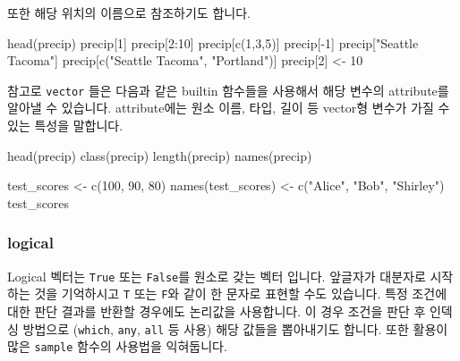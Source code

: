 \documentclass[
  a4paper,
]{book}
\newenvironment{Shaded}{\begin{snugshade}}{\end{snugshade}}
\newcommand{\DecValTok}[1]{\textcolor[rgb]{0.68,0.00,0.00}{#1}}
\newcommand{\FunctionTok}[1]{\textcolor[rgb]{0.28,0.35,0.67}{#1}}
\newcommand{\NormalTok}[1]{\textcolor[rgb]{0.00,0.23,0.31}{#1}}
\newcommand{\OtherTok}[1]{\textcolor[rgb]{0.00,0.23,0.31}{#1}}
\newcommand{\SpecialCharTok}[1]{\textcolor[rgb]{0.37,0.37,0.37}{#1}}
\newcommand{\StringTok}[1]{\textcolor[rgb]{0.13,0.47,0.30}{#1}}
\begin{document}
또한 해당 위치의 이름으로 참조하기도 합니다.

\begin{Shaded}
\begin{Highlighting}[]
\FunctionTok{head}\NormalTok{(precip)}
\NormalTok{precip[}\DecValTok{1}\NormalTok{]}
\NormalTok{precip[}\DecValTok{2}\SpecialCharTok{:}\DecValTok{10}\NormalTok{]}
\NormalTok{precip[}\FunctionTok{c}\NormalTok{(}\DecValTok{1}\NormalTok{,}\DecValTok{3}\NormalTok{,}\DecValTok{5}\NormalTok{)]}
\NormalTok{precip[}\SpecialCharTok{{-}}\DecValTok{1}\NormalTok{]}
\NormalTok{precip[}\StringTok{"Seattle Tacoma"}\NormalTok{]}
\NormalTok{precip[}\FunctionTok{c}\NormalTok{(}\StringTok{"Seattle Tacoma"}\NormalTok{, }\StringTok{"Portland"}\NormalTok{)]}
\NormalTok{precip[}\DecValTok{2}\NormalTok{] }\OtherTok{\textless{}{-}} \DecValTok{10}
\end{Highlighting}
\end{Shaded}

참고로 \texttt{vector} 들은 다음과 같은 builtin 함수들을 사용해서 해당
변수의 attribute를 알아낼 수 있습니다. attribute에는 원소 이름, 타입,
길이 등 vector형 변수가 가질 수 있는 특성을 말합니다.

\begin{Shaded}
\begin{Highlighting}[]
\FunctionTok{head}\NormalTok{(precip)}
\FunctionTok{class}\NormalTok{(precip)}
\FunctionTok{length}\NormalTok{(precip)}
\FunctionTok{names}\NormalTok{(precip)}

\NormalTok{test\_scores }\OtherTok{\textless{}{-}} \FunctionTok{c}\NormalTok{(}\DecValTok{100}\NormalTok{, }\DecValTok{90}\NormalTok{, }\DecValTok{80}\NormalTok{)}
\FunctionTok{names}\NormalTok{(test\_scores) }\OtherTok{\textless{}{-}} \FunctionTok{c}\NormalTok{(}\StringTok{"Alice"}\NormalTok{, }\StringTok{"Bob"}\NormalTok{, }\StringTok{"Shirley"}\NormalTok{)}
\NormalTok{test\_scores}
\end{Highlighting}
\end{Shaded}

\hypertarget{logical}{%
\subsubsection{logical}\label{logical}}

Logical 벡터는 \texttt{True} 또는 \texttt{False}를 원소로 갖는 벡터
입니다. 앞글자가 대분자로 시작하는 것을 기억하시고 \texttt{T} 또는
\texttt{F}와 같이 한 문자로 표현할 수도 있습니다. 특정 조건에 대한 판단
결과를 반환할 경우에도 논리값을 사용합니다. 이 경우 조건을 판단 후
인덱싱 방법으로 (\texttt{which}, \texttt{any}, \texttt{all} 등 사용)
해당 값들을 뽑아내기도 합니다. 또한 활용이 많은 \texttt{sample} 함수의
사용법을 익혀둡니다.
\end{document}
